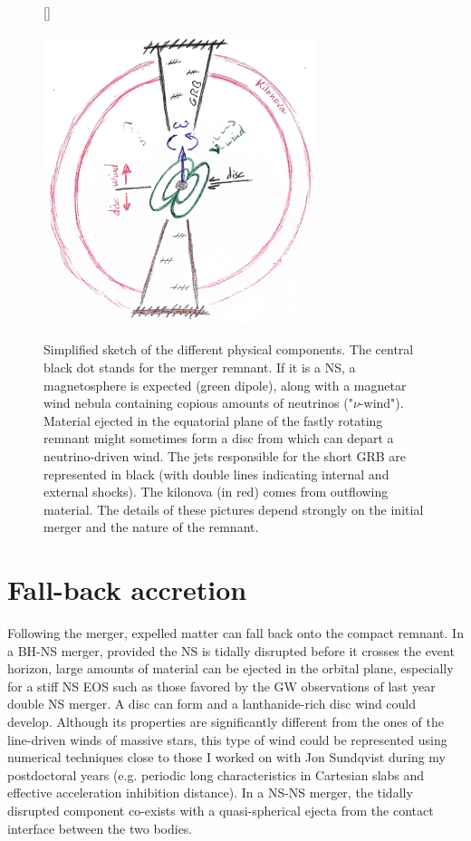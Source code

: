 \documentclass[12pt,onecolumn]{article}
\makeatletter
\newcommand{\gw}{GW\xspace}
\newcommand{\grb}{GRB\xspace}
\newcommand{\eos}{EOS\xspace}
\newcommand*{\ns}{NS\@\xspace}
\newcommand*{\bh}{BH\@\xspace}
\newcommand*{\eg}{e.g.\@\xspace}
\makeatother
\begin{document}
\begin{figure}[!t]
\vspace*{-0.3cm}
[\FBwidth]
{\caption{Simplified sketch of the different physical components. The central black dot stands for the merger remnant. If it is a \ns, a magnetosphere is expected (green dipole), along with a magnetar wind nebula containing copious amounts of neutrinos ("$\nu$-wind"). Material ejected in the equatorial plane of the fastly rotating remnant might sometimes form a disc from which can depart a neutrino-driven wind. The jets responsible for the short \grb are represented in black (with double lines indicating internal and external shocks). The kilonova (in red) comes from outflowing material. The details of these pictures depend strongly on the initial merger and the nature of the remnant.}\label{fig:sketch}}
{\includegraphics[width=8cm]{Figures/sketch_GRB_kilonova.jpg}}
\end{figure}

\section{Fall-back accretion}

Following the merger, expelled matter can fall back onto the compact remnant. In a \bh-\ns merger, provided the \ns is tidally disrupted before it crosses the event horizon, large amounts of material can be ejected in the orbital plane, especially for a stiff \ns \eos such as those favored by the \gw observations of last year double \ns merger. A disc can form and a lanthanide-rich disc wind could develop. Although its properties are significantly different from the ones of the line-driven winds of massive stars, this type of wind could be represented using numerical techniques close to those I worked on with Jon Sundqvist during my postdoctoral years (\eg periodic long characteristics in Cartesian slabs and effective acceleration inhibition distance). In a \ns-\ns merger, the tidally disrupted component co-exists with a quasi-spherical ejecta from the contact interface between the two bodies.
\end{document}
